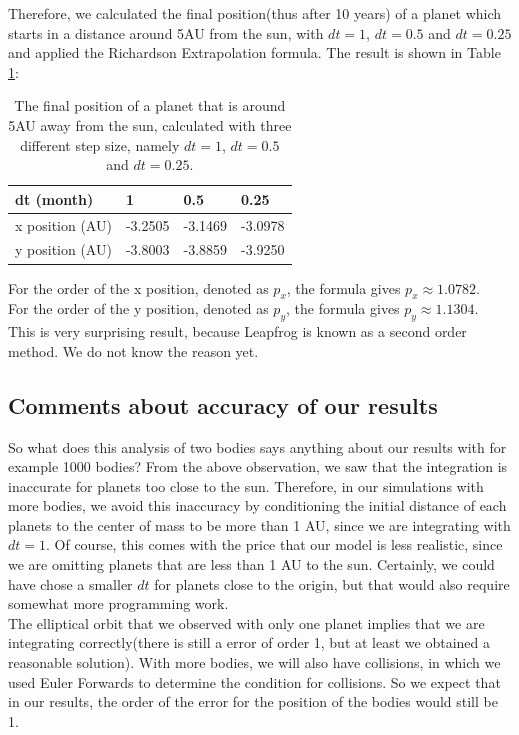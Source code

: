 Therefore, we calculated the final position(thus after 10 years) of a planet which starts in a distance around 5AU from the sun, with $dt=1$, $dt=0.5$ and $dt=0.25$ and applied the Richardson Extrapolation formula. 
The result is shown in Table \ref{tab:Richardson5AU}:

\begin{table}[htb]
\centering
\caption{The final position of a planet that is around 5AU away from the sun, calculated with three different step size, namely $dt=1$, $dt=0.5$ and $dt=0.25$.}
\begin{tabular}{|l|l|l|l|}
\hline
dt (month)&1&0.5&0.25\\ \hline
x position (AU)&-3.2505&   -3.1469&   -3.0978\\ \hline
y position (AU)&   -3.8003&   -3.8859&   -3.9250\\ \hline
\end{tabular}
\label{tab:Richardson5AU}
\end{table}

For the order of the x position, denoted as $p_x$, the formula gives $p_x\approx 1.0782$.\\
For the order of the y position, denoted as $p_y$, the formula gives $p_y\approx 1.1304$.\\ 

This is very surprising result, because Leapfrog is known as a second order method. We do not know the reason yet.
\subsection{Comments about accuracy of our results}
So what does this analysis of two bodies says anything about our results with for example 1000 bodies? From the above observation, we saw that the integration is inaccurate for planets too close to the sun. Therefore, in our simulations with more bodies, we avoid this inaccuracy by conditioning the initial distance of each planets to the center of mass to be more than 1 AU, since we are integrating with $dt=1$. Of course, this comes with the price that our model is less realistic, since we are omitting planets that are less than 1 AU to the sun. Certainly, we could have chose a smaller $dt$ for planets close to the origin, but that would also require somewhat more programming work.\\

The elliptical orbit that we observed with only one planet implies that we are integrating correctly(there is still a error of order 1, but at least we obtained a reasonable solution). With more bodies, we will also have collisions, in which we used Euler Forwards to determine the condition for collisions. So we expect that in our results, the order of the error for the position of the bodies would still be 1.\\

